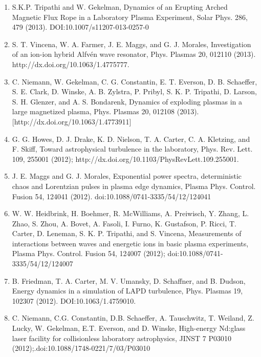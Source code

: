 \documentclass[11pt]{article}
\begin{document}
\begin{enumerate}
\item  S.K.P. Tripathi and W. Gekelman, Dynamics of an Erupting Arched Magnetic Flux Rope in a Laboratory Plasma Experiment, Solar Phys. 286, 479 (2013). DOI:10.1007/s11207-013-0257-0

\item   S. T. Vincena, W. A. Farmer, J. E. Maggs, and G. J. Morales, Investigation of an ion-ion hybrid Alfv\'{e}n wave resonator, Phys. Plasmas  20, 012110 (2013). http://dx.doi.org/10.1063/1.4775777.

\item   C. Niemann, W. Gekelman, C. G. Constantin, E. T. Everson, D. B. Schaeffer, S. E. Clark, D. Winske, A. B. Zylstra, P. Pribyl, S. K. P. Tripathi, D. Larson, S. H. Glenzer, and A. S. Bondarenk, Dynamics of exploding plasmas in a large magnetized plasma, Phys. Plasmas 20, 012108 (2013). [http://dx.doi.org/10.1063/1.4773911]

\item   G. G. Howes, D. J. Drake, K. D. Nielson, T. A. Carter, C. A. Kletzing, and F. Skiff, Toward astrophysical turbulence in the laboratory, Phys. Rev. Lett. 109, 255001 (2012); http://dx.doi.org/10.1103/PhysRevLett.109.255001.

\item   J. E. Maggs and G. J. Morales, Exponential power spectra, deterministic chaos and Lorentzian pulses in plasma edge dynamics, Plasma Phys. Control. Fusion  54, 124041 (2012). doi:10.1088/0741-3335/54/12/124041

\item W. W. Heidbrink, H. Boehmer, R. McWilliams, A. Preiwisch, Y. Zhang, L. Zhao, S. Zhou, A. Bovet, A. Fasoli, I. Furno, K. Gustafson, P. Ricci, T. Carter, D. Leneman, S. K. P. Tripathi, and S. Vincena, Measurements of interactions between waves and energetic ions in basic plasma experiments, Plasma Phys. Control. Fusion 54, 124007 (2012); doi:10.1088/0741-3335/54/12/124007

\item  B. Friedman, T. A. Carter, M. V. Umansky, D. Schaffner, and B. Dudson, Energy dynamics in a simulation of LAPD turbulence, Phys. Plasmas 19, 102307 (2012). DOI:10.1063/1.4759010.

\item  C. Niemann, C.G. Constantin, D.B. Schaeffer, A. Tauschwitz, T. Weiland, Z. Lucky, W. Gekelman, E.T. Everson, and D. Winske, High-energy Nd:glass laser facility for collisionless laboratory astrophysics, JINST 7 P03010 (2012);.doi:10.1088/1748-0221/7/03/P03010


\end{enumerate}
\end{document}
